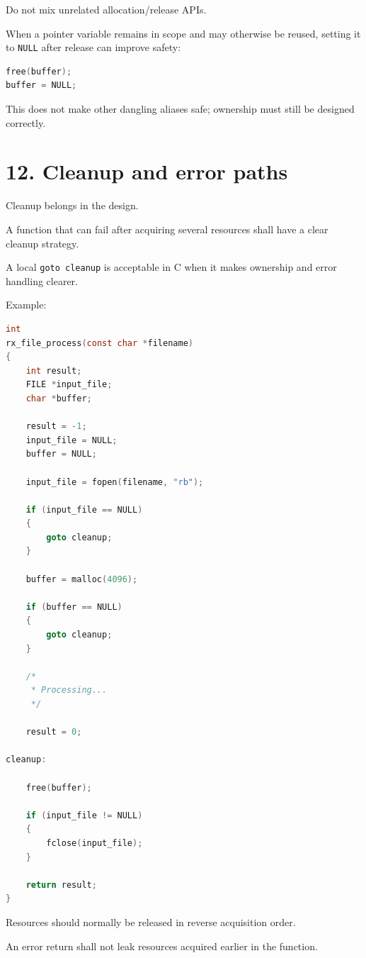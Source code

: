 \documentclass[11pt,a4paper]{article}
\begin{document}
Do not mix unrelated allocation/release APIs.

When a pointer variable remains in scope and may otherwise be reused,
setting it to \passthrough{\lstinline!NULL!} after release can improve
safety:

\begin{lstlisting}[language=C]
free(buffer);
buffer = NULL;
\end{lstlisting}

This does not make other dangling aliases safe; ownership must still be
designed correctly.

\section{12. Cleanup and error paths}\label{12-cleanup-and-error-paths}

Cleanup belongs in the design.

A function that can fail after acquiring several resources shall have a
clear cleanup strategy.

A local \passthrough{\lstinline!goto cleanup!} is acceptable in C when
it makes ownership and error handling clearer.

Example:

\begin{lstlisting}[language=C]
int
rx_file_process(const char *filename)
{
    int result;
    FILE *input_file;
    char *buffer;

    result = -1;
    input_file = NULL;
    buffer = NULL;

    input_file = fopen(filename, "rb");

    if (input_file == NULL)
    {
        goto cleanup;
    }

    buffer = malloc(4096);

    if (buffer == NULL)
    {
        goto cleanup;
    }

    /*
     * Processing...
     */

    result = 0;

cleanup:

    free(buffer);

    if (input_file != NULL)
    {
        fclose(input_file);
    }

    return result;
}
\end{lstlisting}

Resources should normally be released in reverse acquisition order.

An error return shall not leak resources acquired earlier in the
function.
\end{document}
